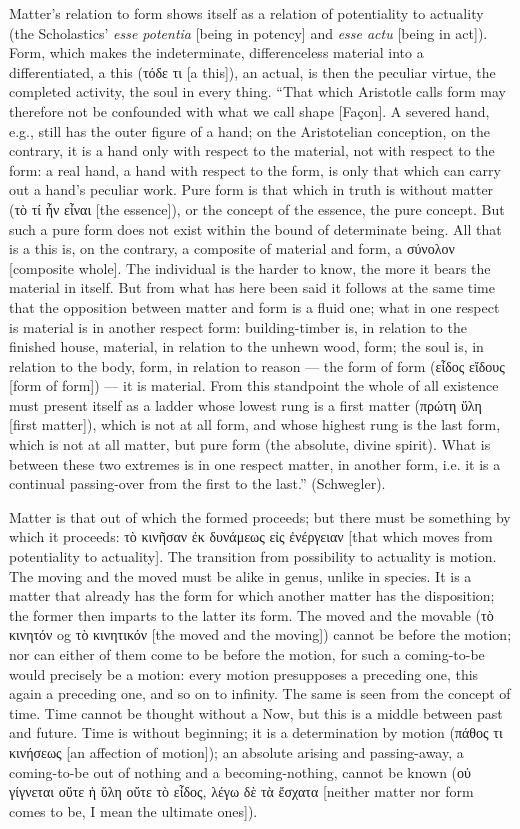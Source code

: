 \documentclass[12pt]{book}
\begin{document}
Matter's relation to form shows itself as a relation of potentiality to actuality (the
Scholastics' \textit{esse potentia} [being in potency] and \textit{esse actu} [being in act]).
Form, which makes the indeterminate, differenceless material into a differentiated, a this (τόδε τι
[a this]), an actual, is then the peculiar virtue, the completed activity, the soul in every thing.
``That which Aristotle
calls form may therefore not be confounded with what we call shape [Façon]. A severed hand, e.g.,
still has the outer figure of a hand; on the Aristotelian conception, on the contrary, it is a hand
only with respect to the material, not with respect to the form: a real hand, a hand with respect
to the form, is only that which can carry out a hand's peculiar work. Pure form is that which in
truth is without matter (τὸ τί ἦν εἶναι [the essence]), or the concept of the essence, the pure
concept. But such a pure form does not exist within the bound of determinate being. All that is a
this is, on the contrary, a composite of material and form, a σύνολον [composite whole]. The
individual is the harder to know, the more it bears the material in itself. But from what has here
been said it follows at the same time that the opposition between matter and form is a fluid one;
what in one respect is material is in another respect form: building-timber is, in relation to the
finished house, material, in relation to the unhewn wood, form; the soul is, in relation to the
body, form, in relation to reason — the form of form (εἶδος εἴδους [form of form]) — it is
material. From this standpoint the whole of all existence must present itself as a ladder whose
lowest rung is a first matter (πρώτη ὕλη [first matter]), which is not at all form, and whose
highest rung is the last form, which is not at all matter, but pure form (the absolute, divine
spirit). What is between these two extremes is in one respect matter, in another form, i.e. it is a
continual passing-over from the first to the last.'' (Schwegler).

Matter is that out of which the formed proceeds; but there must be something by which it proceeds:
τὸ κινῆσαν ἐκ δυνάμεως εἰς ἐνέργειαν [that which moves from potentiality to actuality]. The
transition from possibility to actuality is motion. The moving and the moved must be alike in
genus, unlike in species. It is a matter that already has the form for which another matter has the
disposition; the former then imparts to the latter its form. The moved and the movable (τὸ κινητόν
og τὸ κινητικόν [the moved and the moving])
cannot be before the motion; nor can either of them come to be before the motion, for such a
coming-to-be would precisely be a motion: every motion presupposes a preceding one, this again a
preceding one, and so on to infinity. The same is seen from the concept of time. Time cannot be
thought without a Now, but this is a middle between past and future. Time is without beginning; it
is a determination by motion (πάθος τι κινήσεως [an affection of motion]); an absolute arising and
passing-away, a coming-to-be out of nothing and a becoming-nothing, cannot be known (οὐ γίγνεται
οὔτε ἡ ὕλη οὔτε τὸ εἶδος, λέγω δὲ τὰ ἔσχατα [neither matter nor form comes to be, I mean the
ultimate ones]).
\end{document}
